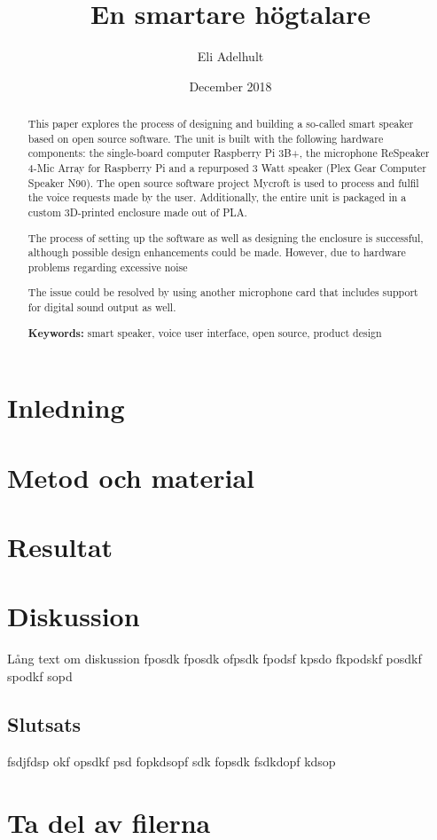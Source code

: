 \documentclass[11pt, a4paper, titlepage]{article}
\title{En smartare högtalare}
\author{Eli Adelhult}
\date{December 2018}
\begin{document}
%
\thispagestyle{empty}
\begin{abstract}
\noindent This paper explores the process of designing and building a so-called smart speaker based on open source software. The unit is built with the following hardware components: the single-board computer Raspberry Pi 3B+, the microphone ReSpeaker 4-Mic Array for Raspberry Pi and a repurposed 3 Watt speaker (Plex Gear Computer Speaker N90). The open source software project Mycroft is used to process and fulfil the voice requests made by the user. Additionally, the entire unit is packaged in a custom 3D-printed enclosure made out of PLA.

The process of setting up the software as well as designing the enclosure is successful, although possible design enhancements could be made. However, due to hardware problems regarding excessive noise 

The issue could be resolved by using another microphone card that includes support for digital sound output as well.

\begin{flushleft}
		{\small {\bf Keywords:} smart speaker, voice user interface, open source, product design}
\end{flushleft}
\end{abstract}

\thispagestyle{empty}

\newpage
\tableofcontents
\thispagestyle{empty}
\newpage

\section{Inledning}


\section{Metod och material} \label{metod}



\section{Resultat}


\section{Diskussion}
Lång text om diskussion fposdk fposdk ofpsdk fpodsf kpsdo fkpodskf posdkf spodkf sopd

\subsection{Slutsats}
fsdjfdsp okf opsdkf psd fopkdsopf sdk fopsdk fsdkdopf kdsop

\section{Ta del av filerna}


\newpage
{} 
\printbibliography
\end{document}
